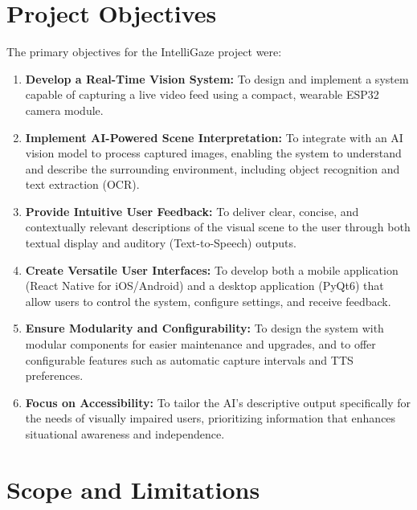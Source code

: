 \documentclass[12pt, a4paper]{report}
\begin{document}
\section{Project Objectives}
The primary objectives for the IntelliGaze project were:
\begin{enumerate}
    \item \textbf{Develop a Real-Time Vision System:} To design and implement a system capable of capturing a live video feed using a compact, wearable ESP32 camera module.
    \item \textbf{Implement AI-Powered Scene Interpretation:} To integrate with an AI vision model to process captured images, enabling the system to understand and describe the surrounding environment, including object recognition and text extraction (OCR).
    \item \textbf{Provide Intuitive User Feedback:} To deliver clear, concise, and contextually relevant descriptions of the visual scene to the user through both textual display and auditory (Text-to-Speech) outputs.
    \item \textbf{Create Versatile User Interfaces:} To develop both a mobile application (React Native for iOS/Android) and a desktop application (PyQt6) that allow users to control the system, configure settings, and receive feedback.
    \item \textbf{Ensure Modularity and Configurability:} To design the system with modular components for easier maintenance and upgrades, and to offer configurable features such as automatic capture intervals and TTS preferences.
    \item \textbf{Focus on Accessibility:} To tailor the AI's descriptive output specifically for the needs of visually impaired users, prioritizing information that enhances situational awareness and independence.
\end{enumerate}

\section{Scope and Limitations}
\end{document}
